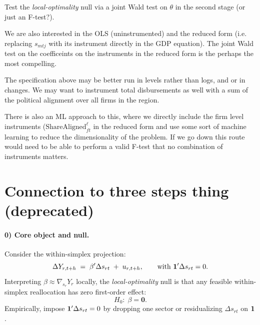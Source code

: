 \documentclass{article}
\begin{document}
Test the \emph{local-optimality} null via a joint Wald test on $\theta$ in the second stage (or just an F-test?).

We are also interested in the OLS (uninstrumented) and the reduced form (i.e. replacing $s_{mtj}$ with its instrument directly in the GDP equation). The joint Wald test on the coefficeints on the instruments in the reduced form is the perhaps the most compelling.

The specification above may be better run in levels rather than logs, and or in changes. We may want to instrument total disbursements as well with a sum of the political alignment over all firms in the region.

There is also an ML approach to this, where we directly include the firm level instruments ($\text{ShareAligned}^{\ell}_{ft}$ in the reduced form and use some sort of machine learning to reduce the dimensionality of the problem. If we go down this route would need to be able to perform a valid F-test that no combination of instruments matters.







\section{Connection to three steps thing (deprecated)}



\paragraph{0) Core object and null.}
Consider the within-simplex projection:
\begin{equation}
    \label{eq:core}
    \Delta Y_{r,t+h} \;=\; \beta' \Delta s_{rt} \;+\; u_{r,t+h},
    \qquad \text{with } \mathbf{1}' \Delta s_{rt} = 0.
\end{equation}
Interpreting $\beta \approx \nabla_{s_r} Y_r$ locally, the \emph{local-optimality} null is that any feasible within-simplex reallocation has zero first-order effect:
\begin{equation}
    \label{eq:null}
    H_0:\; \beta = \mathbf{0}.
\end{equation}
Empirically, impose $\mathbf{1}'\Delta s_{rt}=0$ by dropping one sector or residualizing $\Delta s_{rt}$ on $\mathbf{1}$.
\end{document}
